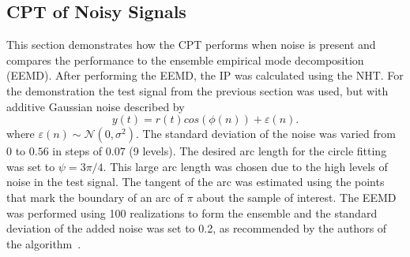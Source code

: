 \documentclass[a4paper]{IEEEtran}
\begin{document}
% 
% 

\subsection{CPT of Noisy Signals}\label{sect:NoisySignalsSection}
This section demonstrates how the CPT performs when noise is present and compares the performance to the ensemble empirical mode decomposition (EEMD). After performing the EEMD, the IP was calculated using the NHT. For the demonstration the test signal from the previous section was used, but with additive Gaussian noise described by
\begin{equation}
    y(t)=r\left(t\right)cos\left(\phi\left(n\right)\right) + \varepsilon \left( n \right).
\end{equation}
where $\varepsilon(n) \sim \mathcal{N}(0,\sigma^2)$. The standard deviation of the noise was varied from $0$ to $0.56$ in steps of $0.07$ (9 levels). The desired arc length for the circle fitting was set to $\psi=3\pi/4$. This large arc length was chosen due to the high levels of noise in the test signal. The tangent of the arc was estimated using the points that mark the boundary of an arc of $\pi$ about the sample of interest. The EEMD was performed using 100 realizations to form the ensemble and the standard deviation of the added noise was set to 0.2, as recommended by the authors of the algorithm~\cite{Wu2009}.
\end{document}
